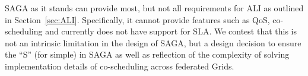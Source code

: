 \documentclass[conference,final]{IEEEtran}
\newcommand{\jhanote}[1]{ {\textcolor{red} { ***Jha: #1 }}}
\newcommand{\hknote}[1]{ {\textcolor{blue} { ***HK: #1 }}}
\begin{document}



SAGA as it stands can provide most, but not all requirements for ALI
as outlined in Section~\ref{sec:ALI}. Specifically, it cannot provide
features such as QoS, co-scheduling and currently does not have
support for SLA.  We contest that this is not an intrinsic limitation
in the design of SAGA, but a design decision to ensure the ``S'' (for
simple) in SAGA as well as reflection of the complexity of solving
implementation details of co-scheduling across federated Grids.

\end{document}
